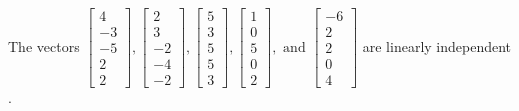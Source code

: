 \begin{exercise}
\begin{exerciseStatement}
  \end{exerciseStatement}
  \begin{exerciseAnswer}
   The vectors \(\left[\begin{array}{r}
4 \\
-3 \\
-5 \\
2 \\
2
\end{array}\right] , \left[\begin{array}{r}
2 \\
3 \\
-2 \\
-4 \\
-2
\end{array}\right] , \left[\begin{array}{r}
5 \\
3 \\
5 \\
5 \\
3
\end{array}\right] , \left[\begin{array}{r}
1 \\
0 \\
5 \\
0 \\
2
\end{array}\right] , \text{ and } \left[\begin{array}{r}
-6 \\
2 \\
2 \\
0 \\
4
\end{array}\right]\) are 
  	 linearly independent  .
  


  \end{exerciseAnswer}
\end{exercise}